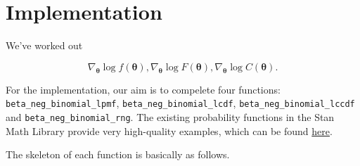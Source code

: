 \documentclass[11pt]{article}
\begin{document}
\section{Implementation}


We've worked out

\begin{equation}
\nabla _{\boldsymbol {\theta}}\log f(\boldsymbol\theta), \nabla _{\boldsymbol {\theta}}\log F(\boldsymbol\theta), \nabla _{\boldsymbol {\theta}}\log C(\boldsymbol\theta).
\end{equation}


For the implementation, our aim is to compelete four functions: \verb|beta_neg_binomial_lpmf|, \verb|beta_neg_binomial_lcdf|, \verb|beta_neg_binomial_lccdf| and \verb|beta_neg_binomial_rng|. The existing probability functions in the Stan Math Library provide very high-quality examples, which can be found \href{https://github.com/stan-dev/math/tree/develop/stan/math/prim/prob}{here}.




The skeleton of each function is basically as follows.
\end{document}
